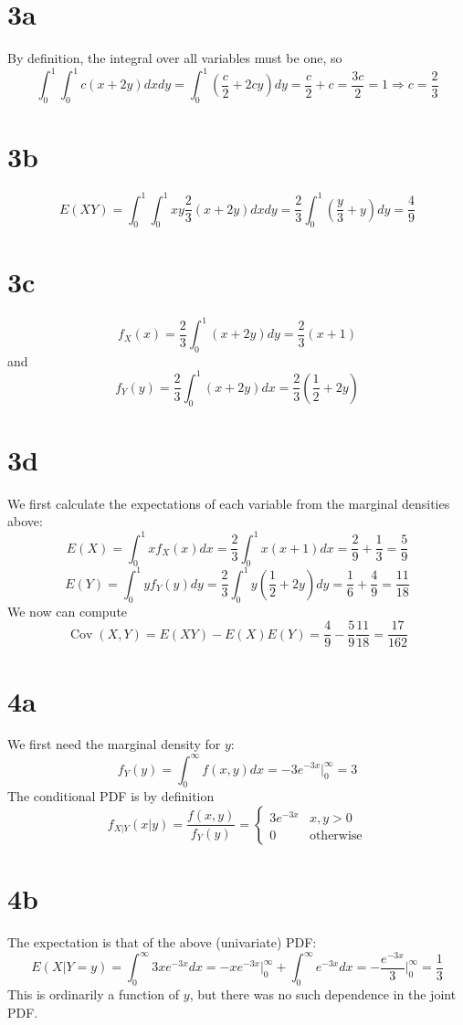 \documentclass{article}
\DeclareMathOperator{\Cov}{Cov}
\begin{document}
\section*{3a}
By definition, the integral over all variables must be one, so
\[\int_0^1\int_0^1c(x+2y)dxdy=\int_0^1\left(\frac{c}{2}+2cy \right)dy=\frac{c}{2}+c=\frac{3c}{2}=1\Rightarrow c=\frac{2}{3}\]

\section*{3b}
\[E(XY)=\int_0^1\int_0^1xy\frac{2}{3}\left(x+2y  \right)dxdy=\frac{2}{3}\int_0^1\left( \frac{y}{3}+y \right)dy=\frac{4}{9}\]

\section*{3c}
\[f_X(x)=\frac{2}{3}\int_0^1\left( x+2y \right)dy=\frac{2}{3}\left( x+1 \right)\]
and
\[f_Y(y)=\frac{2}{3}\int_0^1\left( x+2y \right)dx=\frac{2}{3}\left( \frac{1}{2}+2y \right)\]

\section*{3d}
We first calculate the expectations of each variable from the marginal densities above:
\[E(X)=\int_0^1xf_X(x)dx=\frac{2}{3}\int_0^1x\left( x+1 \right)dx=\frac{2}{9}+\frac{1}{3}=\frac{5}{9}\]
\[E(Y)=\int_0^1yf_Y(y)dy=\frac{2}{3}\int_0^1y\left( \frac{1}{2}+2y \right)dy=\frac{1}{6}+\frac{4}{9}=\frac{11}{18}\]
We now can compute
\[\Cov(X, Y)=E(XY)-E(X)E(Y)=\frac{4}{9}-\frac{5}{9}\frac{11}{18}=\frac{17}{162}\]

\section*{4a}
We first need the marginal density for $y$:
\[f_Y(y)=\int_0^\infty f(x,y)dx=-3e^{-3x}\bigg|_0^\infty=3\]
The conditional PDF is by definition
\[f_{X|Y}(x|y)=\frac{f(x,y)}{f_Y(y)}=\begin{cases}3e^{-3x} & x,y>0 \\ 0 & \textrm{otherwise}\end{cases}\]

\section*{4b}
The expectation is that of the above (univariate) PDF:
\[E(X|Y=y)=\int_0^\infty 3xe^{-3x}dx=-xe^{-3x}\bigg|_0^\infty+\int_0^\infty e^{-3x}dx=-\frac{e^{-3x}}{3}\bigg|_0^\infty= \frac{1}{3}\]
This is ordinarily a function of $y$, but there was no such dependence in the joint PDF.
\end{document}
